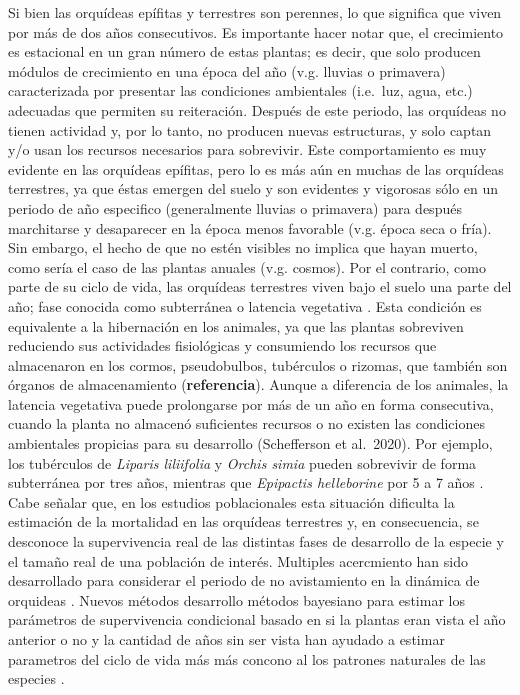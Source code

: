 \documentclass[
]{book}
\theoremstyle{definition}
\theoremstyle{definition}
\theoremstyle{definition}
\theoremstyle{definition}
\theoremstyle{remark}
\begin{document}
Si bien las orquídeas epífitas y terrestres son perennes, lo que significa que viven por más de dos años consecutivos.
Es importante hacer notar que, el crecimiento es estacional en un gran número de estas plantas; es decir, que solo producen módulos de crecimiento en una época del año (v.g. lluvias o primavera) caracterizada por presentar las condiciones ambientales (i.e.~luz, agua, etc.) adecuadas que permiten su reiteración.
Después de este periodo, las orquídeas no tienen actividad y, por lo tanto, no producen nuevas estructuras, y solo captan y/o usan los recursos necesarios para sobrevivir.
Este comportamiento es muy evidente en las orquídeas epífitas, pero lo es más aún en muchas de las orquídeas terrestres, ya que éstas emergen del suelo y son evidentes y vigorosas sólo en un periodo de año especifico (generalmente lluvias o primavera) para después marchitarse y desaparecer en la época menos favorable (v.g. época seca o fría).
Sin embargo, el hecho de que no estén visibles no implica que hayan muerto, como sería el caso de las plantas anuales (v.g. cosmos).
Por el contrario, como parte de su ciclo de vida, las orquídeas terrestres viven bajo el suelo una parte del año; fase conocida como subterránea o latencia vegetativa \citep{shefferson2020demography}.
Esta condición es equivalente a la hibernación en los animales, ya que las plantas sobreviven reduciendo sus actividades fisiológicas y consumiendo los recursos que almacenaron en los cormos, pseudobulbos, tubérculos o rizomas, que también son órganos de almacenamiento (\textbf{referencia}).
Aunque a diferencia de los animales, la latencia vegetativa puede prolongarse por más de un año en forma consecutiva, cuando la planta no almacenó suficientes recursos o no existen las condiciones ambientales propicias para su desarrollo (Schefferson et al.~2020).
Por ejemplo, los tubérculos de \emph{Liparis liliifolia} \citep{hutchings1987population, wells1991demographic} y \emph{Orchis simia} \citep{willems1991population} pueden sobrevivir de forma subterránea por tres años, mientras que \emph{Epipactis helleborine} por 5 a 7 años \citep{light2006appearance}.
Cabe señalar que, en los estudios poblacionales esta situación dificulta la estimación de la mortalidad en las orquídeas terrestres y, en consecuencia, se desconoce la supervivencia real de las distintas fases de desarrollo de la especie y el tamaño real de una población de interés.
Multiples acercmiento han sido desarrollado para considerar el periodo de no avistamiento en la dinámica de orquideas \citep{shefferson2003life, kery2004demographic, shefferson2005adult}.
Nuevos métodos desarrollo métodos bayesiano para estimar los parámetros de supervivencia condicional basado en si la plantas eran vista el año anterior o no y la cantidad de años sin ser vista han ayudado a estimar parametros del ciclo de vida más más concono al los patrones naturales de las especies \citep{tremblay2009dormancy, tremblay2009population}.
\end{document}

